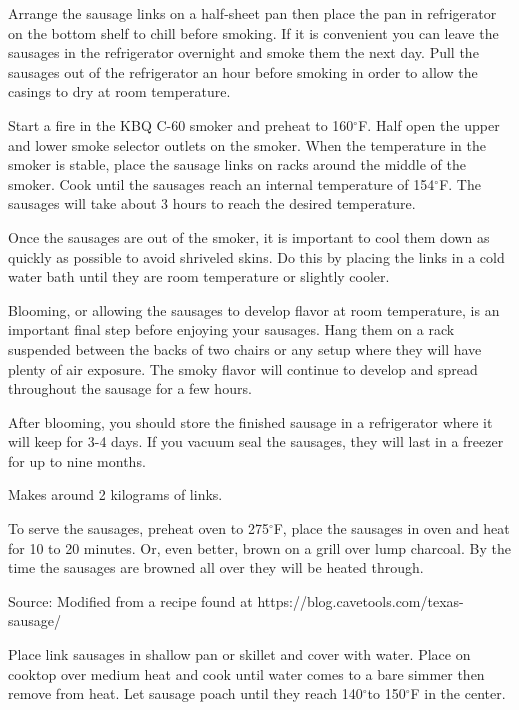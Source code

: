 \documentclass[letterpaper]{recipePMG}
\renewcommand{\deg}{$^\circ$}
\begin{document}
Arrange the sausage links on a half-sheet pan then place the pan in refrigerator on the bottom shelf to chill before smoking. If it is convenient you can leave the sausages in the refrigerator overnight and smoke them the next day. Pull the sausages out of the refrigerator an hour before smoking in order to allow the casings to dry at room temperature.

Start a fire in the KBQ C-60 smoker and preheat to 160\deg F. Half open the upper and lower smoke selector outlets on the  smoker.  When the temperature in the smoker is stable, place the sausage links on racks around the middle of the smoker. Cook until  the sausages reach an internal temperature of 154\deg F.  The sausages will take about 3 hours to reach the desired temperature.
   
Once the sausages are out of the smoker, it is important to cool them down as quickly as possible to avoid shriveled skins. Do this by placing the links in a cold water bath until they are room temperature or slightly cooler.


Blooming, or allowing the sausages to develop flavor at room temperature, is an important final step before enjoying your sausages. Hang them on a rack suspended between the backs of two chairs or any setup where they will have plenty of air exposure. The smoky flavor will continue to develop and spread throughout the sausage for a few hours. 

After blooming, you should store the finished sausage in a refrigerator where it will keep for 3-4 days. If you vacuum seal the sausages, they will last in a freezer for up to nine months.

Makes around 2 kilograms of links.

To serve the sausages, preheat oven to 275\deg F, place the sausages in oven and heat for 10 to 20 minutes. Or, even better, brown on a grill over lump charcoal. By the time the sausages are browned all over they will be heated through.

Source: Modified from a recipe found at https://blog.cavetools.com/texas-sausage/


\newpage
{}
 
 
 Place link sausages in shallow pan or skillet and cover with water.  Place on cooktop over medium heat and cook until water comes to a bare simmer then remove from heat.  Let sausage poach until they reach 140\deg to 150\deg F in the center. 
 
\end{document}
